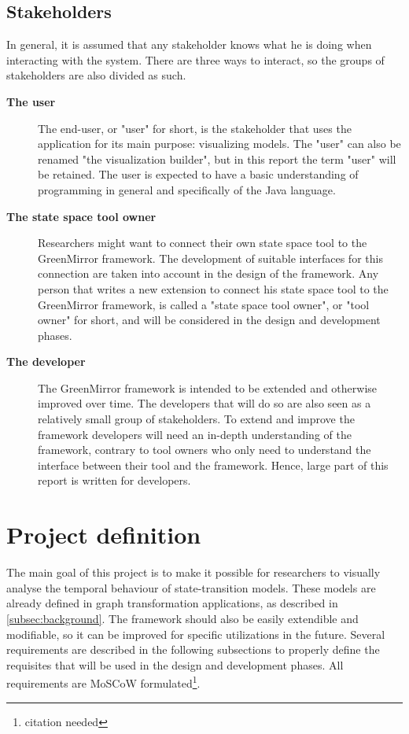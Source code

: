 \documentclass[a4paper]{article}
\begin{document}
	\subsection{Stakeholders}
	\label{subsec:stakeholders}
	In general, it is assumed that any stakeholder knows what he is doing when interacting with the system. There are three ways to interact, so the groups of stakeholders are also divided as such.
	\begin{description}
		\item[\textbf{The user}] The end-user, or "user" for short, is the stakeholder that uses the application for its main purpose: visualizing models. The "user" can also be renamed "the visualization builder", but in this report the term "user" will be retained. The user is expected to have a basic understanding of programming in general and specifically of the Java language.
		\item[\textbf{The state space tool owner}] Researchers might want to connect their own state space tool to the GreenMirror framework. The development of suitable interfaces for this connection are taken into account in the design of the framework. Any person that writes a new extension to connect his state space tool to the GreenMirror framework, is called a "state space tool owner", or "tool owner" for short, and will be considered in the design and development phases.
		\item[\textbf{The developer}] The GreenMirror framework is intended to be extended and otherwise improved over time. The developers that will do so are also seen as a relatively small group of stakeholders. To extend and improve the framework developers will need an in-depth understanding of the framework, contrary to tool owners who only need to understand the interface between their tool and the framework. Hence, large part of this report is written for developers.
	\end{description}
	
	
	
	
	
	
	
	
	
	\section{Project definition}\label{sec:projectdefinition}
	The main goal of this project is to make it possible for researchers to visually analyse the temporal behaviour of state-transition models. These models are already defined in graph transformation applications, as described in
	{\cref{subsec:background}}. The framework should also be easily extendible and modifiable, so it can be improved for specific utilizations in the future. Several requirements are described in the following subsections to properly define the requisites that will be used in the design and development phases. All requirements are MoSCoW formulated\footnote{citation needed}.
	
\end{document}
